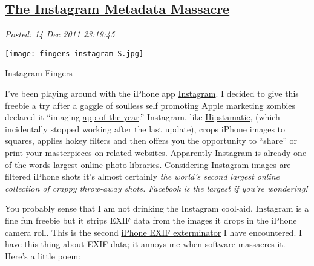 %

\subsection*{\href{http://bakerjd99.wordpress.com/2011/12/14/the-instagram-metadata-massacre/}{The Instagram Metadata Massacre}}


\noindent\emph{Posted: 14 Dec 2011 23:19:45}
\vspace{6pt}


\captionsetup[floatingfigure]{labelformat=empty}
\begin{floatingfigure}[r]{0.23\textwidth}
\centering
\href{http://conceptcontrol.smugmug.com/Themes/Diaries/Cell-Phoning-It-In/17756793\_PfCsJz}{\texttt{[image: fingers-instagram-S.jpg]}}
\caption{Instagram  Fingers}
\label{fig:2287X0}
\end{floatingfigure}I've been playing around with the iPhone app
\href{http://itunes.apple.com/us/app/instagram/id389801252?mt=8}{Instagram}.
I decided to give this freebie a try after a gaggle of soulless self
promoting Apple marketing zombies declared it
``imaging \href{http://articles.businessinsider.com/2011-12-08/tech/30489467\_1\_android-apps-ipad}{app
of the year}.'' Instagram, like
\href{http://hipstamatic.com/the\_app.html}{Hipstamatic}, (which
incidentally stopped working after the last update), crops iPhone images
to squares, applies hokey filters and then offers you the opportunity to
``share'' or print your masterpieces on related websites. Apparently
Instagram is already one of the words largest online photo libraries.
Considering Instagram images are filtered iPhone shots it's almost
certainly \emph{the world's second largest online collection of crappy
throw-away shots. Facebook is the largest if you're wondering!}

You probably sense that I am not drinking the Instagram cool-aid.
Instagram is a fine fun freebie but it strips EXIF data from the images
it drops in the iPhone camera roll. This is the
second \href{http://bakerjd99.wordpress.com/2011/04/03/smugshot-metadata-mess/}{iPhone
EXIF exterminator} I have encountered. I have this thing about EXIF
data; it annoys me when software massacres it.
Here's a little poem:

